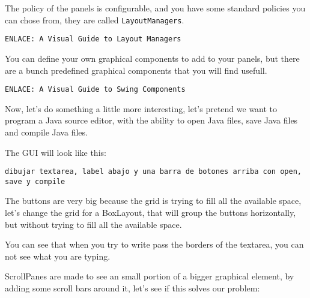 \documentclass[a4paper, 9pt]{extarticle}
\begin{document}
The policy of the panels is configurable, and you have some standard policies
you can chose from, they are called \verb+LayoutManagers+.

\verb+ENLACE: A Visual Guide to Layout Managers+


You can define your own graphical components to add to your panels, but there
are a bunch predefined graphical components that you will find usefull.

\verb+ENLACE: A Visual Guide to Swing Components+

Now, let's do something a little more interesting, let's pretend we want to
program a Java source editor, with the ability to open Java files, save Java
files and compile Java files.

The GUI will look like this:

\verb+dibujar textarea, label abajo y una barra de botones arriba con open, save y compile+


The buttons are very big because the grid is trying to fill all the available
space, let's change the grid for a BoxLayout, that will group the buttons
horizontally, but without trying to fill all the available space.


You can see that when you try to write pass the borders of the textarea, you
can not see what you are typing.

ScrollPanes are made to see an small portion of a bigger graphical element, by
adding some scroll bars around it, let's see if this solves our problem:

\end{document}
